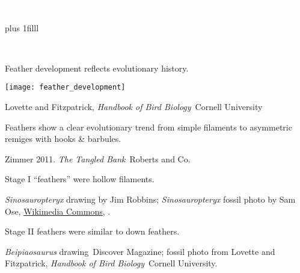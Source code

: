 \documentclass[t]{beamer}
\begin{document}
{
\begin{frame}[t,plain]{\textcolor{white}{Why do you think feathers first evolved?}}

	

	
	\vskip0pt plus 1filll

\hfill\tiny\textcolor{white}{Cretaceous feather, Vinther et al. 2008. Biology Letters 4: 522.}	
\end{frame}
}
%
\begin{frame}[t,plain]{Feather development reflects evolutionary history.}


	\texttt{[image: feather\_development]}
	
	\vfilll
	
	\tiny \hfill Lovette and Fitzpatrick, \textit{Handbook of Bird Biology} \textcopyright\,Cornell University
	
\end{frame}
%
{
\begin{frame}[b,plain]{Feathers show a clear evolutionary trend from simple filaments to asymmetric remiges with hooks {\normalsize \&} barbules.}

\vfilll

\tiny \hfill Zimmer 2011. \textit{The Tangled Bank} \textcopyright\,Roberts and Co.

\end{frame}
}
%
{
\begin{frame}[t,plain]{Stage I “feathers” were hollow filaments.}

\vfilll

\tiny \hfill \textit{Sinosauropteryx} drawing by Jim Robbins; \textit{Sinosauropteryx} fossil photo by Sam Ose, \href{https://commons.wikimedia.org/w/index.php?curid=4209411}{Wikimedia Commons}, .

\end{frame}
}
%
{
\begin{frame}[t,plain]{Stage II feathers were similar to down feathers.}

\vfilll

\tiny \hfill \textit{Beipiaosaurus} drawing \textcopyright\,Discover Magazine; fossil photo from Lovette and Fitzpatrick, \textit{Handbook of Bird Biology} \textcopyright\,Cornell University.

\end{frame}
}
%
\end{document}
